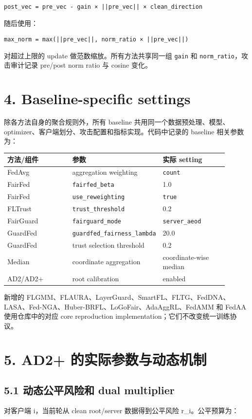 \documentclass[UTF8,a4paper,10pt]{ctexart}
\begin{document}
\begin{lstlisting}
post_vec = pre_vec - gain × ||pre_vec|| × clean_direction
\end{lstlisting}
随后使用：

\begin{lstlisting}
max_norm = max(||pre_vec||, norm_ratio × ||pre_vec||)
\end{lstlisting}
对超过上限的 update 做范数缩放。所有方法共享同一组 \texttt{gain} 和 \texttt{norm\_ratio}，攻击审计记录 pre/post norm ratio 与 cosine 变化。

\section{4. Baseline-specific settings}
除各方法自身的聚合规则外，所有 baseline 共用同一个数据预处理、模型、optimizer、客户端划分、攻击配置和指标实现。代码中记录的 baseline 相关参数为：

{\small
\renewcommand{\arraystretch}{1.18}
\begin{longtable}{|p{0.300\linewidth}|p{0.300\linewidth}|p{0.300\linewidth}|}
\hline
方法/组件 & 参数 & 实际 setting \\\hline
\endhead
FedAvg & aggregation weighting & \texttt{count} \\\hline
FairFed & \texttt{fairfed\_beta} & 1.0 \\\hline
FairFed & \texttt{use\_reweighting} & \texttt{true} \\\hline
FLTrust & \texttt{trust\_threshold} & 0.2 \\\hline
FairGuard & \texttt{fairguard\_mode} & \texttt{server\_aeod} \\\hline
GuardFed & \texttt{guardfed\_fairness\_lambda} & 20.0 \\\hline
GuardFed & trust selection threshold & 0.2 \\\hline
Median & coordinate aggregation & coordinate-wise median \\\hline
AD2/AD2+ & root calibration & enabled \\\hline
\end{longtable}
}
新增的 FLGMM、FLAURA、LayerGuard、SmartFL、FLTG、FedDNA、LASA、Fed-NGA、Huber-BRFL、LoGoFair、AdaAggRL、FedAMM 和 FedAA 使用仓库中的对应 core reproduction implementation；它们不改变统一训练协议。

\section{5. AD2+ 的实际参数与动态机制}
\subsection{5.1 动态公平风险和 dual multiplier}
对客户端 i，当前轮从 clean root/server 数据得到公平风险 r\_i。公平预算为：
\end{document}
